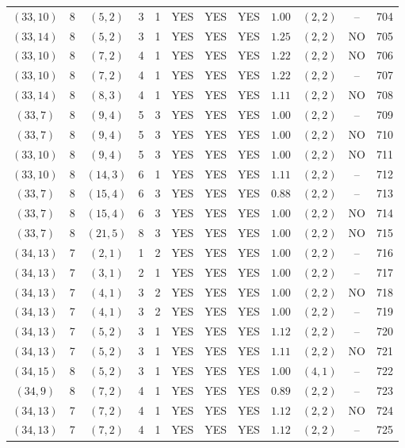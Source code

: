 \begin{longtable}{|c|c|c|c|c|c|c|c|c|c|c|c|}
$(33,10)$ & 8 & $(5,2)$ & 3 & 1 & YES & YES & YES & $1.00$ & $(2,2)$ & -- & 704\\
$(33,14)$ & 8 & $(5,2)$ & 3 & 1 & YES & YES & YES & $1.25$ & $(2,2)$ & NO & 705\\
$(33,10)$ & 8 & $(7,2)$ & 4 & 1 & YES & YES & YES & $1.22$ & $(2,2)$ & NO & 706\\
$(33,10)$ & 8 & $(7,2)$ & 4 & 1 & YES & YES & YES & $1.22$ & $(2,2)$ & -- & 707\\
$(33,14)$ & 8 & $(8,3)$ & 4 & 1 & YES & YES & YES & $1.11$ & $(2,2)$ & NO & 708\\
$(33,7)$ & 8 & $(9,4)$ & 5 & 3 & YES & YES & YES & $1.00$ & $(2,2)$ & -- & 709\\
$(33,7)$ & 8 & $(9,4)$ & 5 & 3 & YES & YES & YES & $1.00$ & $(2,2)$ & NO & 710\\
$(33,10)$ & 8 & $(9,4)$ & 5 & 3 & YES & YES & YES & $1.00$ & $(2,2)$ & NO & 711\\
$(33,10)$ & 8 & $(14,3)$ & 6 & 1 & YES & YES & YES & $1.11$ & $(2,2)$ & -- & 712\\
$(33,7)$ & 8 & $(15,4)$ & 6 & 3 & YES & YES & YES & $0.88$ & $(2,2)$ & -- & 713\\
$(33,7)$ & 8 & $(15,4)$ & 6 & 3 & YES & YES & YES & $1.00$ & $(2,2)$ & NO & 714\\
$(33,7)$ & 8 & $(21,5)$ & 8 & 3 & YES & YES & YES & $1.00$ & $(2,2)$ & NO & 715\\
$(34,13)$ & 7 & $(2,1)$ & 1 & 2 & YES & YES & YES & $1.00$ & $(2,2)$ & -- & 716\\
$(34,13)$ & 7 & $(3,1)$ & 2 & 1 & YES & YES & YES & $1.00$ & $(2,2)$ & -- & 717\\
$(34,13)$ & 7 & $(4,1)$ & 3 & 2 & YES & YES & YES & $1.00$ & $(2,2)$ & NO & 718\\
$(34,13)$ & 7 & $(4,1)$ & 3 & 2 & YES & YES & YES & $1.00$ & $(2,2)$ & -- & 719\\
$(34,13)$ & 7 & $(5,2)$ & 3 & 1 & YES & YES & YES & $1.12$ & $(2,2)$ & -- & 720\\
$(34,13)$ & 7 & $(5,2)$ & 3 & 1 & YES & YES & YES & $1.11$ & $(2,2)$ & NO & 721\\
$(34,15)$ & 8 & $(5,2)$ & 3 & 1 & YES & YES & YES & $1.00$ & $(4,1)$ & -- & 722\\
$(34,9)$ & 8 & $(7,2)$ & 4 & 1 & YES & YES & YES & $0.89$ & $(2,2)$ & -- & 723\\
$(34,13)$ & 7 & $(7,2)$ & 4 & 1 & YES & YES & YES & $1.12$ & $(2,2)$ & NO & 724\\
$(34,13)$ & 7 & $(7,2)$ & 4 & 1 & YES & YES & YES & $1.12$ & $(2,2)$ & -- & 725\\

\end{longtable}
